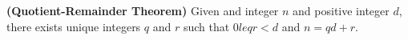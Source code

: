 \guard

\begin{thm}
\label{thm:quotientRemainderTheorem}
  \textbf{(Quotient-Remainder Theorem)}
  Given and integer $n$ and positive integer $d$, there exists unique integers $q$ and $r$ such that $0leq r < d$ and $n=qd + r$.
\end{thm}
%
